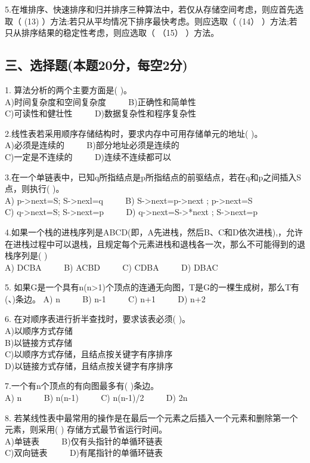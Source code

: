 5.在堆排序、快速排序和归并排序三种算法中，若仅从存储空间考虑，则应首先选取（ (13) ）方法:若只从平均情况下排序最快考虑。则应选取（ (14） ）方法;若只从排序结果的稳定性考虑，则应选取（ （15） ）方法。

\subsection{三、选择题(本题20分，每空2分)}

1. 算法分析的两个主要方面是( )。 \\
A)时间复杂度和空间复杂度 $\qquad$ B)正确性和简单性 \\
C)可读性和健壮性 $\qquad$ D)数据复杂性和程序复杂性

2.线性表若采用顺序存储结构时，要求内存中可用存储单元的地址( )。 \\
A)必须是连续的 $\qquad$ B)部分地址必须是连续的 \\
C)一定是不连续的 $\qquad$ D)连续不连续都可以

3.在一个单链表中，已知q所指结点是p所指结点的前驱结点，若在q和p之间插入S点，则执行( )。 \\
A) p->next=S; S->nexl=q $\qquad$ B) S->next=p->next ; p->next=S \\
C) q->next=S; S->next=p $\qquad$ D) q->next=S->*next ; S->next=p

4.如果一个栈的进栈序列是ABCD(即，A先进栈，然后B、C和D依次进栈),，允许在进栈过程中可以退栈，且规定每个元素进栈和退栈各一次，那么不可能得到的退栈序列是( ) \\
A) DCBA $\qquad$ B) ACBD $\qquad$ C) CDBA $\qquad$ D) DBAC

5. 如果G是一个具有n(n>1)个顶点的连通无向图，T是G的一棵生成树，那么T有(、)条边。
A) n $\qquad$ B) n-1 $\qquad$ C) n+1 $\qquad$ D) n+2

6. 在对顺序表进行折半查找时，要求该表必须( )。 \\
A)以顺序方式存储 \\
B)以链接方式存储 \\
C)以顺序方式存储，且结点按关键字有序排序 \\
D)以链接方式存储，且结点按关键字有序排序

7.一个有n个顶点的有向图最多有( )条边。 \\
A) n $\qquad$ B) n(n-1) $\qquad$ C) n(n-1)/2 $\qquad$ D) 2n

8. 若某线性表中最常用的操作是在最后一个元素之后插入一个元素和删除第一个元素，则采用( ) 存储方式最节省运行时间。 \\
A)单链表 $\qquad$ B)仅有头指针的单循环链表 \\
C)双向链表 $\qquad$ D)有尾指针的单循环链表

